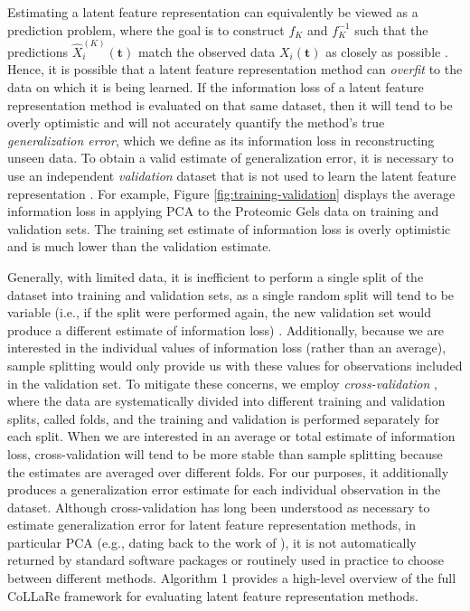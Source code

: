 Estimating a latent feature representation can equivalently be viewed as a prediction problem, where the goal is to construct $f_{K}$ and $f_{K}^{-1}$ such that the predictions $\widehat{X}_i^{(K)}(\mathbf{t})$ match the observed data $X_i(\mathbf{t})$ as closely as possible \parencite{krzanowski_cross-validation_1987, wold_cross-validatory_1978, diana_cross-validation_2002}.
Hence, it is possible that a latent feature representation method can \emph{overfit} to the data on which it is being learned.
If the information loss of a latent feature representation method is evaluated on that same dataset, then it will tend to be overly optimistic and will not accurately quantify the method's true \emph{generalization error}, which we define as its information loss in reconstructing unseen data.
To obtain a valid estimate of generalization error, it is necessary to use an independent \emph{validation} dataset that is not used to learn the latent feature representation \parencite{diana_cross-validation_2002}.
For example, Figure \ref{fig:training-validation} displays the average information loss in applying PCA to the Proteomic Gels data \parencite{morris_pinnacle_2008} on training and validation sets.
The training set estimate of information loss is overly optimistic and is much lower than the validation estimate.


Generally, with limited data, it is inefficient to perform a single split of the dataset into training and validation sets, as a single random split will tend to be variable (i.e., if the split were performed again, the new validation set would produce a different estimate of information loss) \parencite[Table 1]{collins_evaluation_2024}.
Additionally, because we are interested in the individual values of information loss (rather than an average), sample splitting would only provide us with these values for observations included in the validation set. 
To mitigate these concerns, we employ \emph{cross-validation} \parencite{stone_cross-validatory_1974}, where the data are systematically divided into different training and validation splits, called folds, and the training and validation is performed separately for each split.
When we are interested in an average or total estimate of information loss, cross-validation will tend to be more stable than sample splitting because the estimates are averaged over different folds.
For our purposes, it additionally produces a generalization error estimate for each individual observation in the dataset.
Although cross-validation has long been understood as necessary to estimate generalization error for latent feature representation methods, in particular PCA (e.g., dating back to the work of \textcite{wold_cross-validatory_1978, eastment_cross-validatory_1982, krzanowski_cross-validation_1987}), it is not automatically returned by standard software packages or routinely used in practice to choose between different methods.
Algorithm 1 provides a high-level overview of the full CoLLaRe framework for evaluating latent feature representation methods.





